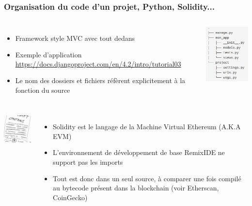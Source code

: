 \documentclass{beamer}
\begin{document}
    \begin{frame}
        \transdissolve
        \frametitle{Organisation du code d'un projet, Python, Solidity...}

        \begin{columns}


            \begin{itemize}

                \item Framework style MVC avec tout dedans
                \item Exemple d'application \url{https://docs.djangoproject.com/en/4.2/intro/tutorial03}
                \item Le nom des dossiers et fichiers réfèrent explicitement à la fonction du source

            \end{itemize}


            \centering
            \includegraphics[width=3cm]{image/flask-project-structure.png}

        \end{columns}

        \begin{columns}


            \centering
            \includegraphics[width=3cm]{image/smart-contract.png}

            \begin{itemize}

                \item Solidity est le langage de la Machine Virtual Ethereum (A.K.A EVM)
                \item L'environnement de développement de base RemixIDE ne support pas les imports
                \item Tout est donc dans un seul source, à comparer une fois compilé au bytecode présent dans la blockchain (voir Etherscan, CoinGecko)

            \end{itemize}


        \end{columns}

    \end{frame}
\end{document}
